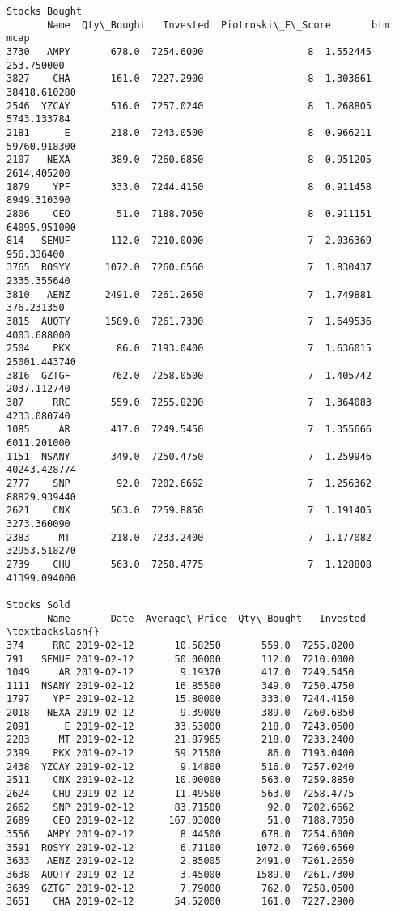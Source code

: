 \documentclass[11pt]{article}
\begin{document}
\begin{Verbatim}[commandchars=\\\{\}]
Stocks Bought
       Name  Qty\_Bought   Invested  Piotroski\_F\_Score       btm          mcap
3730   AMPY       678.0  7254.6000                  8  1.552445    253.750000
3827    CHA       161.0  7227.2900                  8  1.303661  38418.610280
2546  YZCAY       516.0  7257.0240                  8  1.268805   5743.133784
2181      E       218.0  7243.0500                  8  0.966211  59760.918300
2107   NEXA       389.0  7260.6850                  8  0.951205   2614.405200
1879    YPF       333.0  7244.4150                  8  0.911458   8949.310390
2806    CEO        51.0  7188.7050                  8  0.911151  64095.951000
814   SEMUF       112.0  7210.0000                  7  2.036369    956.336400
3765  ROSYY      1072.0  7260.6560                  7  1.830437   2335.355640
3810   AENZ      2491.0  7261.2650                  7  1.749881    376.231350
3815  AUOTY      1589.0  7261.7300                  7  1.649536   4003.688000
2504    PKX        86.0  7193.0400                  7  1.636015  25001.443740
3816  GZTGF       762.0  7258.0500                  7  1.405742   2037.112740
387     RRC       559.0  7255.8200                  7  1.364083   4233.080740
1085     AR       417.0  7249.5450                  7  1.355666   6011.201000
1151  NSANY       349.0  7250.4750                  7  1.259946  40243.428774
2777    SNP        92.0  7202.6662                  7  1.256362  88829.939440
2621    CNX       563.0  7259.8850                  7  1.191405   3273.360090
2383     MT       218.0  7233.2400                  7  1.177082  32953.518270
2739    CHU       563.0  7258.4775                  7  1.128808  41399.094000

Stocks Sold
       Name       Date  Average\_Price  Qty\_Bought   Invested  \textbackslash{}
374     RRC 2019-02-12       10.58250       559.0  7255.8200
791   SEMUF 2019-02-12       50.00000       112.0  7210.0000
1049     AR 2019-02-12        9.19370       417.0  7249.5450
1111  NSANY 2019-02-12       16.85500       349.0  7250.4750
1797    YPF 2019-02-12       15.80000       333.0  7244.4150
2018   NEXA 2019-02-12        9.39000       389.0  7260.6850
2091      E 2019-02-12       33.53000       218.0  7243.0500
2283     MT 2019-02-12       21.87965       218.0  7233.2400
2399    PKX 2019-02-12       59.21500        86.0  7193.0400
2438  YZCAY 2019-02-12        9.14800       516.0  7257.0240
2511    CNX 2019-02-12       10.00000       563.0  7259.8850
2624    CHU 2019-02-12       11.49500       563.0  7258.4775
2662    SNP 2019-02-12       83.71500        92.0  7202.6662
2689    CEO 2019-02-12      167.03000        51.0  7188.7050
3556   AMPY 2019-02-12        8.44500       678.0  7254.6000
3591  ROSYY 2019-02-12        6.71100      1072.0  7260.6560
3633   AENZ 2019-02-12        2.85005      2491.0  7261.2650
3638  AUOTY 2019-02-12        3.45000      1589.0  7261.7300
3639  GZTGF 2019-02-12        7.79000       762.0  7258.0500
3651    CHA 2019-02-12       54.52000       161.0  7227.2900


\end{Verbatim}
\end{document}
